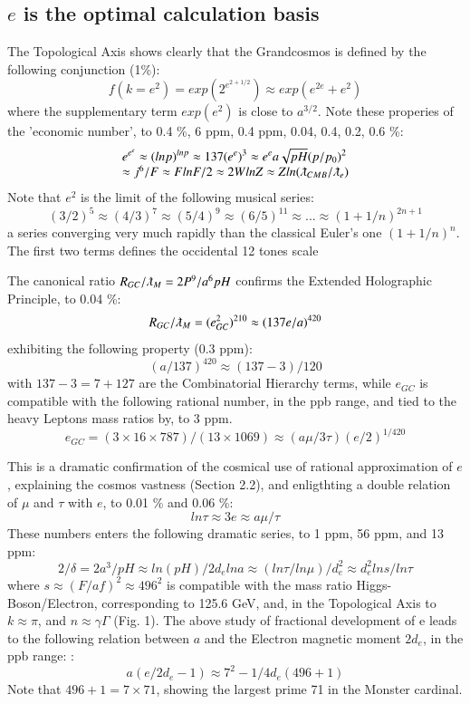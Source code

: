 \documentclass[twoside,draft]{article}
\begin{document}
\begin{sloppypar}
{\subsection {$e$ is the optimal calculation basis}

The Topological Axis shows clearly that the Grandcosmos is defined by the following conjunction (1\%):
\begin{equation}
f(k = e^{2}) = exp(2^{e^{2+1/2}}) \approx exp(e^{2e}+e^{2})
\end{equation}
where the supplementary term $exp(e^2)$ is close to $a^{3/2}$. Note these properies of the 'economic number', to 
0.4 \%, 6 ppm, 0.4 ppm, 0.04, 0.4, 0.2, 0.6 \%:
$$
\begin{array}{ll}
%
\displaystyle
e^{e^e}\approx (lnp)^{lnp}  
\approx 137 (e^{e})^3 \approx e^e a \sqrt{pH} (p/p_0)^2 \\
\approx j^6/F \approx FlnF/2 \approx 2WlnZ \approx Zln(\lambdabar_{CMB}/\lambdabar_e) 
\end{array}
$$
Note that $e^2$ is the limit of the following musical series:
$$(3/2)^5 \approx (4/3)^7   \approx (5/4)^9  \approx  (6/5)^{11}  \approx   ...  \approx  (1+1/n)^{2n+1}  $$  
a series converging very much rapidly than the classical Euler's one $(1+1/n)^n$. The first two terms defines the occidental 12 tones scale

The canonical ratio $R_{GC}/\lambdabar_M = 2P^9/a^6pH $ confirms the Extended Holographic Principle, to 0.04 \%:
\begin{equation}
R_{GC}/\lambdabar_M  = (e_{GC}^2)^{210}  \approx (137e/a)^{420}  
\end{equation}
exhibiting the following property (0.3 ppm):
 $$ (a/137)^{420} \approx (137 - 3)/120 $$  
with $137 - 3 = 7 + 127$ are the Combinatorial Hierarchy terms, while $e_{GC}$ is compatible with the following rational number, in the ppb range, and tied to the heavy Leptons mass ratios by, to 3 ppm.
$$e_{GC} = (3 \times 16 \times 787)/(13 \times 1069) \approx (a\mu/3\tau) (e/2)^{1/420}$$

This is a dramatic confirmation of the cosmical use of rational approximation of $e$, explaining the cosmos vastness (Section 2.2), and enligthting a double relation of $\mu$ and $\tau$ with $e$, to 0.01 \% and 0.06 \%:
\begin{equation}
ln\tau \approx 3e \approx a\mu/\tau 
\end{equation}
These numbers enters the following dramatic series, to 1 ppm, 56 ppm, and 13 ppm:
\begin{equation}
2/\delta = 2a^3/pH \approx ln(pH)/2d_e lna \approx (ln\tau/ln\mu)/d_e^2 \approx d_e^2 ln s/ln\tau
\end{equation}
where $s \approx (F/af)^2 \approx 496^2 $ is compatible with the mass ratio Higgs-Boson/Electron, corresponding to 125.6 GeV, and, in the Topological Axis to $k \approx \pi $, and $n \approx \gamma \Gamma$ (Fig. 1).
The above study of fractional development of e leads to the following relation between $a$ and the Electron magnetic moment $2d_e$, in the ppb range: :$$a(e/2d_e-1) \approx 7^2-1/4d_e(496+1)$$ Note that $496 + 1 = 7 \times 71$, showing the largest prime 71 in the Monster cardinal.


}
\end{sloppypar}
\end{document}
